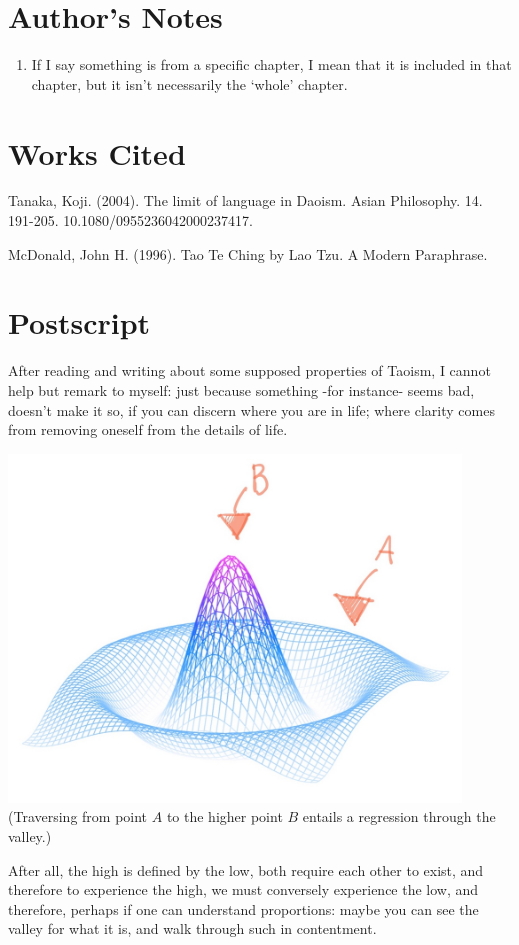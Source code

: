 \newpage

\section*{\centering Author's Notes}

\begin{enumerate}
    \item If I say something is from a specific chapter, I mean that it is included in that chapter, but it isn’t necessarily the ‘whole’ chapter.
\end{enumerate}


\section*{\centering Works Cited}

Tanaka, Koji. (2004). The limit of language in Daoism. Asian Philosophy. 14. 191-205. 10.1080/0955236042000237417.

McDonald, John H. (1996). Tao Te Ching by Lao Tzu. A Modern Paraphrase.

\section*{\centering Postscript}

After reading and writing about some supposed properties of Taoism, I cannot help but remark to myself: just because something -for instance- seems bad, doesn’t make it so, if you can discern where you are in life; where clarity comes from removing oneself from the details of life.

\begin{center}
    \includegraphics[width=0.9\textwidth]{../assets/image3.jpg}
    \footnotesize (Traversing from point $A$ to the higher point $B$ entails a regression through the valley.)
\end{center}

After all, the high is defined by the low, both require each other to exist, and therefore to experience the high, we must conversely experience the low, and therefore, perhaps if one can understand proportions: maybe you can see the valley for what it is, and walk through such in contentment.

